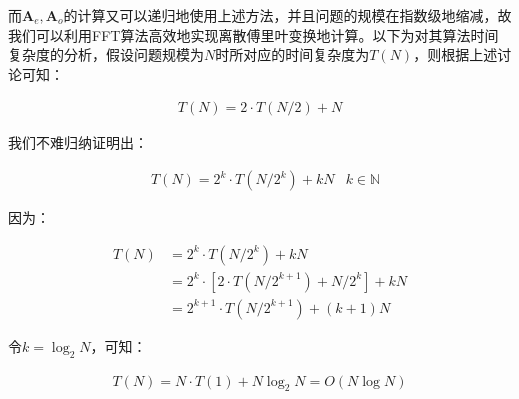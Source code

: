 \documentclass[UTF8]{book}
\begin{document}
而$\mathbf{A}_e, \mathbf{A}_o$的计算又可以递归地使用上述方法，并且问题的规模在指数级地缩减，故我们可以利用FFT算法高效地实现离散傅里叶变换地计算。以下为对其算法时间复杂度的分析，假设问题规模为$N$时所对应的时间复杂度为$T(N)$，则根据上述讨论可知：
\begin{large}
    \begin{equation}
        \begin{aligned}
            T(N)=2 \cdot T(N/2)+N
            \nonumber
        \end{aligned}
    \end{equation}
\end{large}
我们不难归纳证明出：
\begin{large}
    \begin{equation}
        \begin{aligned}
            &T(N)=2^k \cdot T(N/2^k)+kN & k \in \mathbb{N}
            \nonumber
        \end{aligned}
    \end{equation}
\end{large}
因为：
\begin{large}
    \begin{equation}
        \begin{aligned}
            T(N)&=2^k \cdot T(N/2^k)+kN \\
            &=2^k \cdot \left [ 2\cdot T(N/2^{k+1})+N/2^k \right ]+kN \\
            &=2^{k+1} \cdot T(N/2^{k+1}) + (k+1)N
            \nonumber
        \end{aligned}
    \end{equation}
\end{large}
令$k=\log_2 N$，可知：
\begin{large}
    \begin{equation}
        \begin{aligned}
            T(N)=N \cdot T(1)+N\log_2 N=O\left ( N\log N \right )
            \nonumber
        \end{aligned}
    \end{equation}
\end{large}
\end{document}
